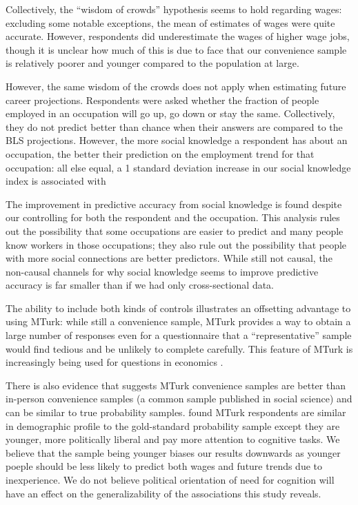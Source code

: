 \documentclass[12pt]{article}
\begin{document}
Collectively, the ``wisdom of crowds'' hypothesis seems to hold regarding wages: 
excluding some notable exceptions, the mean of estimates of wages were quite accurate. 
However, respondents did underestimate the wages of higher wage jobs, though it is unclear how much of this is due to face that our
convenience sample is relatively poorer and younger compared to the population at large. 


However, the same wisdom of the crowds does not apply when estimating future career projections.
Respondents were asked whether the fraction of people employed in an occupation will go up, go down or stay the same. 
Collectively, they do not predict better than chance when their answers are compared to the BLS projections. 
However, the more social knowledge a respondent has about an occupation, the better their prediction on the employment trend for that occupation: %
all else equal, a 1 standard deviation increase in our social knowledge index is associated with 

The improvement in predictive accuracy from social knowledge is found despite our controlling for both the respondent and the occupation.
This analysis rules out the possibility that some occupations are easier to predict and many people know workers in those occupations; 
they also rule out the possibility that people with more social connections are better predictors.
While still not causal, the non-causal channels for why social knowledge seems to improve predictive accuracy is far smaller than if we had only cross-sectional data. %


The ability to include both kinds of controls illustrates an offsetting advantage to using MTurk: 
while still a convenience sample, MTurk provides a way to obtain a large number of responses even for a questionnaire that a ``representative'' sample would find tedious and be unlikely to complete carefully.
This feature of MTurk is increasingly being used for questions in economics  \citep{kuziemko2013elastic, saez2013generalized}. 

There is also evidence that suggests MTurk convenience samples are better than in-person convenience samples (a common sample published in social science) and can be similar to true probability samples. \citet{Berinsky2012} found MTurk respondents are similar in demographic profile to the gold-standard probability sample except they are younger, more politically liberal and pay more attention to cognitive tasks. We believe that the sample being younger biases our results downwards as younger poeple should be less likely to predict both wages and future trends due to inexperience. We do not believe political orientation of need for cognition will have an effect on the generalizability of the associations this study reveals.
\end{document}
